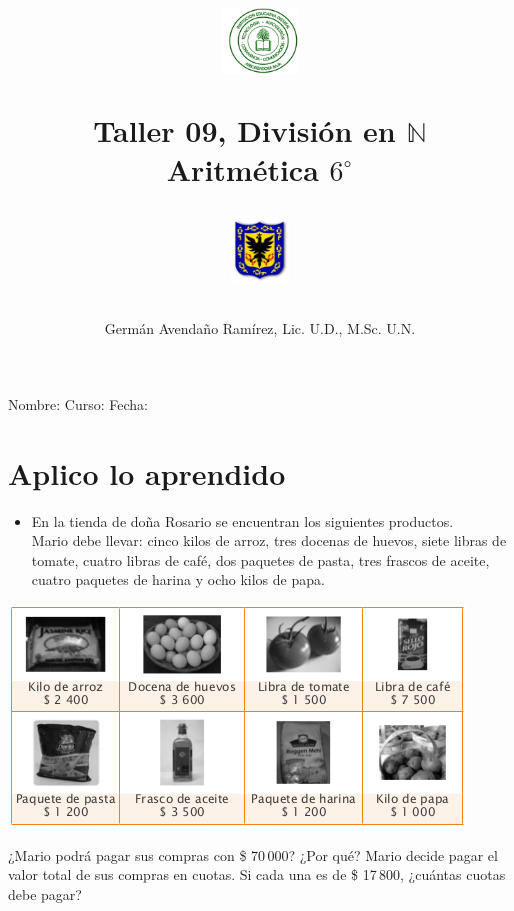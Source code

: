 \documentclass[letterpaper,11pt,twoside]{article}
\author{Germ\'an Avenda\~no Ram\'irez, Lic. U.D., M.Sc. U.N.}
\title{\begin{minipage}{.2\textwidth}
\includegraphics[height=1.75cm]{Images/logo-colegio.png}\end{minipage}
\begin{minipage}{.55\textwidth}
\begin{center}
Taller 09, Divisi\'{o}n en $\mathbb{N}$\\
Aritm\'{e}tica $6^{\circ}$
\end{center}
\end{minipage}\hfill
\begin{minipage}{.2\textwidth}
\includegraphics[height=1.75cm]{Images/logo-sed.png} 
\end{minipage}}
\date{}
\begin{document}
\maketitle
Nombre: \hrulefill Curso: \underline{\hspace*{44pt}} Fecha: \underline{\hspace*{2.5cm}}
 \section*{Aplico lo aprendido}
 \begin{minipage}{.3\textwidth}
  \begin{itemize}
 \item En la tienda de doña Rosario se encuentran los
siguientes productos.\\

Mario debe llevar: cinco kilos de arroz, tres docenas de
huevos, siete libras de tomate, cuatro libras de café, dos
paquetes de pasta, tres frascos de aceite, cuatro paquetes
de harina y ocho kilos de papa.
\end{itemize}
 \end{minipage}\hfill
 \begin{minipage}{.7\textwidth}
\begin{center}
\includegraphics[scale=.76]{Images/productos.png} 
\end{center} 
 \end{minipage}
¿Mario podrá pagar sus compras con \$ 70\,000? ¿Por qué?
Mario decide pagar el valor total de sus compras en cuotas.
Si cada una es de \$ 17\,800, ¿cuántas cuotas debe pagar?
\end{document}
